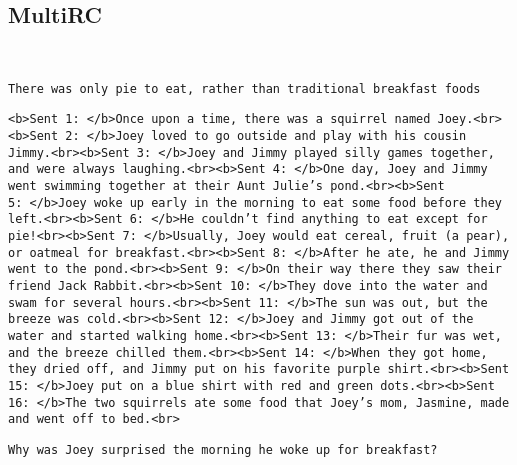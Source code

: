 \documentclass[twoside,11pt]{article}
\begin{document}
\subsection{MultiRC}
\begin{description}[leftmargin=0.5cm]
\item[Original input:] ~
\begin{description}[leftmargin=0.5cm]
  \item[Answer:] \texttt{There was only pie to eat, rather than traditional breakfast foods}
  \item[Paragraph:] \texttt{<b>Sent 1:\ </b>Once upon a time, there was a squirrel named Joey.<br><b>Sent 2:\ </b>Joey loved to go outside and play with his cousin Jimmy.<br><b>Sent 3:\ </b>Joey and Jimmy played silly games together, and were always laughing.<br><b>Sent 4:\ </b>One day, Joey and Jimmy went swimming together at their Aunt Julie's pond.<br><b>Sent 5:\ </b>Joey woke up early in the morning to eat some food before they left.<br><b>Sent 6:\ </b>He couldn't find anything to eat except for pie!<br><b>Sent 7:\ </b>Usually, Joey would eat cereal, fruit (a pear), or oatmeal for breakfast.<br><b>Sent 8:\ </b>After he ate, he and Jimmy went to the pond.<br><b>Sent 9:\ </b>On their way there they saw their friend Jack Rabbit.<br><b>Sent 10:\ </b>They dove into the water and swam for several hours.<br><b>Sent 11:\ </b>The sun was out, but the breeze was cold.<br><b>Sent 12:\ </b>Joey and Jimmy got out of the water and started walking home.<br><b>Sent 13:\ </b>Their fur was wet, and the breeze chilled them.<br><b>Sent 14:\ </b>When they got home, they dried off, and Jimmy put on his favorite purple shirt.<br><b>Sent 15:\ </b>Joey put on a blue shirt with red and green dots.<br><b>Sent 16:\ </b>The two squirrels ate some food that Joey's mom, Jasmine, made and went off to bed.<br>}
  \item[Question:] \texttt{Why was Joey surprised the morning he woke up for breakfast?}
\end{description}

\end{description}
\end{document}
